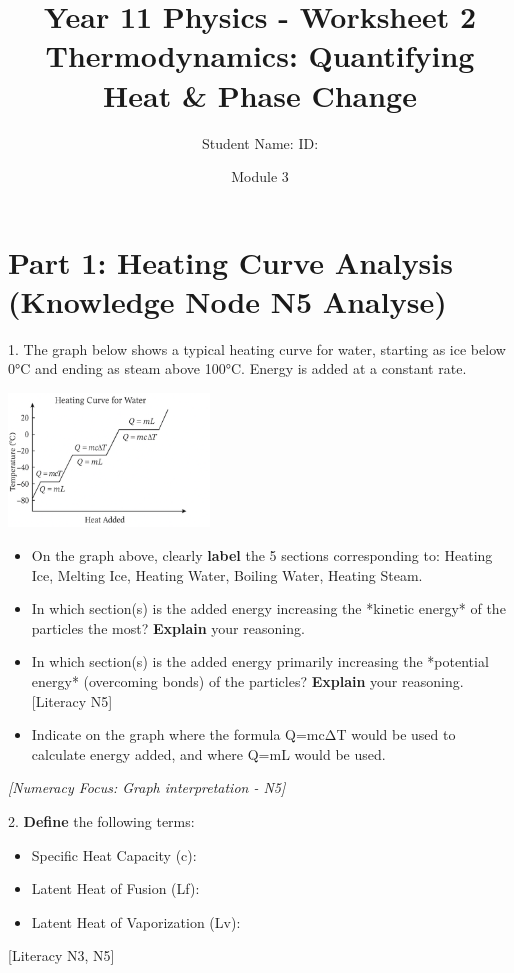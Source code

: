 \documentclass[11pt, a4paper]{article}
\title{Year 11 Physics - Worksheet 2 \\ Thermodynamics: Quantifying Heat & Phase Change}
\date{Module 3}
\author{Student Name: \underline{\hspace{5cm}} ID: \underline{\hspace{3cm}}} %
\begin{document}
\maketitle

\section*{Part 1: Heating Curve Analysis (Knowledge Node N5 Analyse)}

1.  The graph below shows a typical heating curve for water, starting as ice below 0\si{\celsius} and ending as steam above 100\si{\celsius}. Energy is added at a constant rate.

    \begin{center}
    \includegraphics[width=0.4\textwidth]{img/water_heating.png}
    \end{center}

    \begin{itemize}
        \item[(a)] On the graph above, clearly \textbf{label} the 5 sections corresponding to: Heating Ice, Melting Ice, Heating Water, Boiling Water, Heating Steam.
        \item[(b)] In which section(s) is the added energy increasing the *kinetic energy* of the particles the most? \textbf{Explain} your reasoning. \vspace{1cm}
        \item[(c)] In which section(s) is the added energy primarily increasing the *potential energy* (overcoming bonds) of the particles? \textbf{Explain} your reasoning. [Literacy N5] \vspace{1cm}
        \item[(d)] Indicate on the graph where the formula Q=mcΔT would be used to calculate energy added, and where Q=mL would be used.
    \end{itemize}
    \textit{[Numeracy Focus: Graph interpretation - N5]}

2.  \textbf{Define} the following terms:
    \begin{itemize}
        \item Specific Heat Capacity (c): \vspace{1cm}
        \item Latent Heat of Fusion (Lf): \vspace{1cm}
        \item Latent Heat of Vaporization (Lv): \vspace{1cm}
    \end{itemize}
    [Literacy N3, N5]
\end{document}
